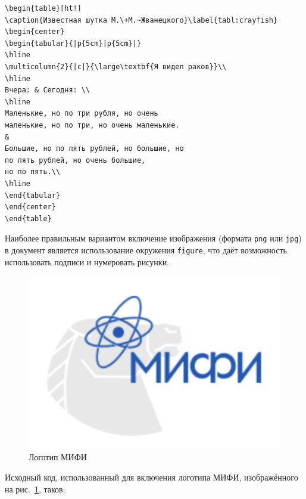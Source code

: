 \begin{small}
\begin{verbatim}
\begin{table}[ht!]
\caption{Известная шутка М.\+М.~Жванецкого}\label{tabl:crayfish}
\begin{center}
\begin{tabular}{|p{5cm}|p{5cm}|}
\hline
\multicolumn{2}{|c|}{\large\textbf{Я видел раков}}\\
\hline
Вчера: & Сегодня: \\
\hline
Маленькие, но по три рубля, но очень
маленькие, но по три, но очень маленькие.
&
Большие, но по пять рублей, но большие, но
по пять рублей, но очень большие,
но по пять.\\
\hline
\end{tabular}
\end{center}
\end{table}
\end{verbatim}
\end{small}

Наиболее правильным вариантом включение изображения (формата \verb|png| или
\verb|jpg|)
в документ является использование окружения \verb|figure|, что
даёт возможность использовать подписи и нумеровать рисунки.

\begin{figure}[ht!]
\begin{center}
\includegraphics[scale=0.8]{images/mephi_logo}
\end{center}
\vspace*{-8mm}
\caption{Логотип МИФИ}\label{fig:mephi_logo}
\end{figure}

\newpage

Исходный код, использованный для включения логотипа МИФИ,
изображённого на рис.~\ref{fig:mephi_logo}, таков:

